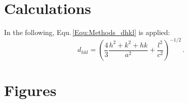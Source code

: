 \begin{appendices}
\chapter{Calculations}
In the following, Equ.\,\ref{Equ:Methods_dhkl} is applied:
\begin{equation*}
    d_{hkl}=\left(
        \frac{4}{3}\frac{h^2+k^2+hk}{a^2}
        +\frac{l^2}{c^2}
    \right)^{-1/2}\,.
\end{equation*}




\chapter{Figures}


\end{appendices}